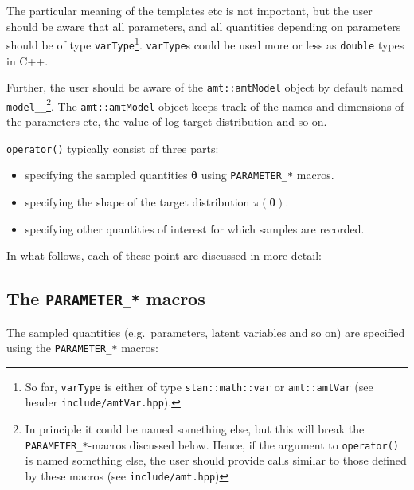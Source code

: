 \documentclass[
]{book}
\providecommand{\tightlist}{%
  \setlength{\itemsep}{0pt}\setlength{\parskip}{0pt}}
\begin{document}
The particular meaning of the templates etc is not important, but the
user should be aware that all parameters, and all quantities depending
on parameters should be of type \texttt{varType}\footnote{So far, \texttt{varType} is either of type \texttt{stan::math::var} or \texttt{amt::amtVar} (see header \texttt{include/amtVar.hpp}).}. \texttt{varType}s could be used more
or less as \texttt{double} types in C++.

Further, the user should be aware of the \texttt{amt::amtModel} object by default named \texttt{model\_\_}\footnote{In principle it could be named something else, but this will break the \texttt{PARAMETER\_*}-macros discussed below. Hence, if the argument to \texttt{operator()} is named something else, the user should provide calls similar to those defined by these macros (see \texttt{include/amt.hpp})}. The \texttt{amt::amtModel} object keeps track of the names and dimensions of the parameters etc, the value of log-target distribution and so on.

\texttt{operator()} typically consist of three parts:

\begin{itemize}
\tightlist
\item
  specifying the sampled quantities \(\boldsymbol \theta\) using \texttt{PARAMETER\_*} macros.
\item
  specifying the shape of the target distribution \(\pi(\boldsymbol \theta)\).
\item
  specifying other quantities of interest for which samples are recorded.
\end{itemize}

In what follows, each of these point are discussed in more detail:

\hypertarget{the-parameter_-macros}{%
\subsection{\texorpdfstring{The \texttt{PARAMETER\_*} macros}{The PARAMETER\_* macros}}\label{the-parameter_-macros}}

The sampled quantities (e.g.~parameters, latent variables and so on) are specified using the \texttt{PARAMETER\_*} macros:
\end{document}
